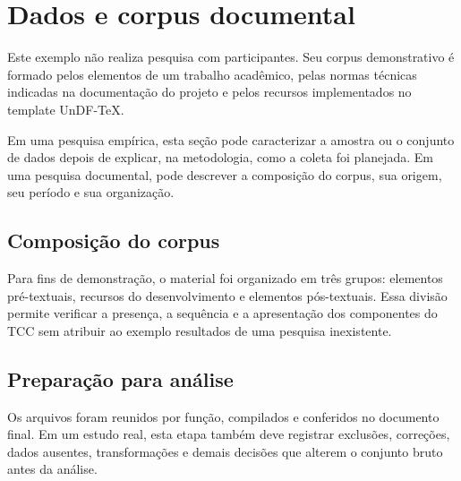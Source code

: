 %

\chapter{Dados e corpus documental}

Este exemplo não realiza pesquisa com participantes. Seu corpus demonstrativo é formado pelos elementos de um trabalho acadêmico, pelas normas técnicas indicadas na documentação do projeto e pelos recursos implementados no template UnDF-TeX.

Em uma pesquisa empírica, esta seção pode caracterizar a amostra ou o conjunto de dados depois de explicar, na metodologia, como a coleta foi planejada. Em uma pesquisa documental, pode descrever a composição do corpus, sua origem, seu período e sua organização.

\section{Composição do corpus}

Para fins de demonstração, o material foi organizado em três grupos: elementos pré-textuais, recursos do desenvolvimento e elementos pós-textuais. Essa divisão permite verificar a presença, a sequência e a apresentação dos componentes do TCC sem atribuir ao exemplo resultados de uma pesquisa inexistente.

\section{Preparação para análise}

Os arquivos foram reunidos por função, compilados e conferidos no documento final. Em um estudo real, esta etapa também deve registrar exclusões, correções, dados ausentes, transformações e demais decisões que alterem o conjunto bruto antes da análise.
